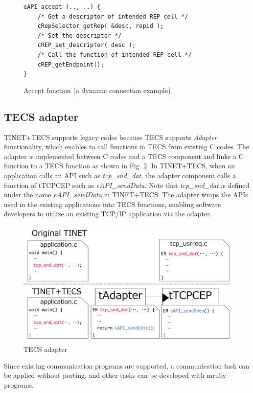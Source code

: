\documentclass[a4j,12pt,oneside,openany,english]{jsbook}
\begin{document}
\begin{figure}[t]
\centering
\begin{lstlisting}
eAPI_accept (.., ..) {
    /* Get a descriptor of intended REP cell */
    cRepSelector_getRep( &desc, repid );
    /* Set the descriptor */
    cREP_set_descriptor( desc );
    /* Call the function of intended REP cell */
    cREP_getEndpoint();
}
\end{lstlisting}
\caption{Accept function (a dynamic connection example)}
\label{src:DynamicCcode}
\end{figure}



\subsection{TECS adapter}
\label{sec:TECSAdapter}

TINET+TECS supports legacy codes because TECS supports {\it Adapter} functionality, which enables to call functions in TECS from existing C codes.
The adapter is implemented between C codes and a TECS component and links a C function to a TECS function as shown in Fig. \ref{fig:TECSAdapter}.
In TINET+TECS, when an application calls an API such as {\it tcp\_snd\_dat}, the adapter component calls a function of tTCPCEP such as {\it eAPI\_sendData}.
Note that {\it tcp\_snd\_dat} is defined under the name {\it eAPI\_sendData} in TINET+TECS.
The adapter wraps the APIs used in the existing applications into TECS functions, enabling software developers to utilize an existing TCP/IP application via the adapter.

\begin{figure}[t]
    \centering
    \includegraphics[width=12cm,clip]{figure/TECSAdapter.pdf}
    \caption{TECS adapter}
    \label{fig:TECSAdapter}
\end{figure}

Since existing communication programs are supported, a communication task can be applied without porting, and other tasks can be developed with mruby programs.
\end{document}
